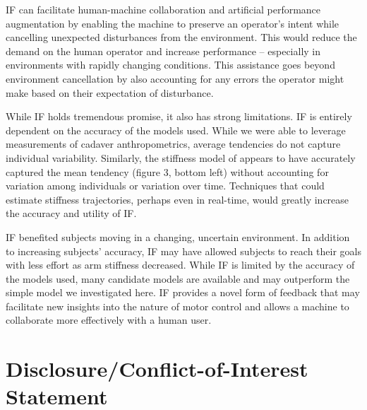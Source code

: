 \documentclass{frontiersSCNS} %
\begin{document}
IF can facilitate human-machine collaboration and artificial performance augmentation by enabling the machine to preserve an operator's intent while cancelling unexpected disturbances from the environment. This would reduce the demand on the human operator and increase performance -- especially in environments with rapidly changing conditions. This assistance goes beyond environment cancellation by also accounting for any errors the operator might make based on their expectation of disturbance.

While IF holds tremendous promise, it also has strong limitations. IF is entirely dependent on the accuracy of the models used. While we were able to leverage measurements of cadaver anthropometrics, average tendencies do not capture individual variability. Similarly, the stiffness model of \cite{shadmehr1994adaptive} appears to have accurately captured the mean tendency (figure 3, bottom left) without accounting for variation among individuals or variation over time. Techniques that could estimate stiffness trajectories, perhaps even in real-time, would greatly increase the accuracy and utility of IF.

IF benefited subjects moving in a changing, uncertain environment. In addition to increasing subjects' accuracy, IF may have allowed subjects to reach their goals with less effort as arm stiffness decreased. While IF is limited by the accuracy of the models used, many candidate models are available and may outperform the simple model we investigated here. IF provides a novel form of feedback that may facilitate new insights into the nature of motor control and allows a machine to collaborate more effectively with a human user.


\section*{Disclosure/Conflict-of-Interest Statement}
\end{document}
